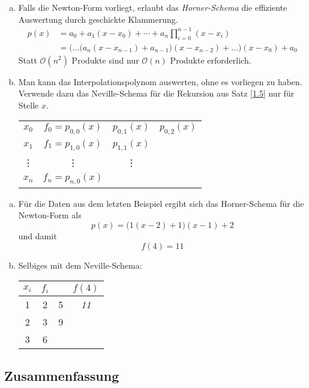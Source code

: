 \documentclass[
]{mycourse}
\begin{document}
\begin{enumerate}[a)]
	\item 
		Falls die Newton-Form vorliegt, erlaubt das \emph{Horner-Schema} die effiziente Auswertung durch geschickte Klammerung.
		\begin{align*}
			p(x) &= a_0 + a_1(x-x_0) + \dotsb + a_n\prod_{i=0}^{n-1}(x-x_i)\\
				&= \bigg(\dotso \Big(a_n(x-x_{n-1}) + a_{n-1}\Big)(x-x_{n-2}) + \dotso \bigg)(x-x_0) +  a_0
		\end{align*}
		Statt $\mathcal O(n^2)$ Produkte sind nur  $\mathcal O(n)$ Produkte erforderlich.
	\item
		Man kann das Interpolationspolynom auswerten, ohne es vorliegen zu haben.
		Verwende dazu das Neville-Schema für die Rekursion aus Satz \ref{1.5} nur für Stelle $x$.
		\begin{table}[H]
			\centering
			\begin{tabular}{cccc}
				$x_0$ & $f_0=p_{0,0}(x)$ & $p_{0,1}(x)$ & $p_{0,2}(x)$ \\
				$x_1$ & $f_1=p_{1,0}(x)$ & $p_{1,1}(x)$ &  \\
				\vdots & \vdots & \vdots\\
				$x_n$ & $f_n=p_{n,0}(x)$ &\\
			\end{tabular}
		\end{table}
\end{enumerate}

\begin{ex*}
	\begin{enumerate}[a)]
		\item 
			Für die Daten aus dem letzten Beispiel ergibt sich das Horner-Schema für die Newton-Form als
			\[
				p(x) = \Big(1(x-2)+1\Big)(x-1) +2
			\]
			und damit
			\[
				f(4) = 11
			\]
		\item
			Selbiges mit dem Neville-Schema:
			\begin{table}[H]
				\centering
				\begin{tabular}{c|ccc}
					$x_i$ & $f_i$ &  & $f(4)$ \\ \hline
					1 & 2 & 5 & \emph{11}\\
					2 & 3 & 9\\
					3 & 6
				\end{tabular}
			\end{table}
	\end{enumerate}
\end{ex*}

\subsection{Zusammenfassung}
\label{sec:polintsum}
\end{document}
